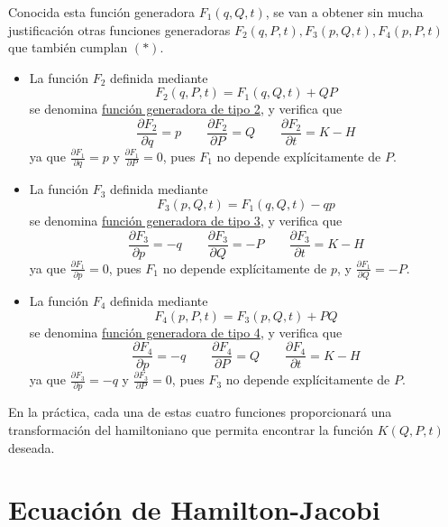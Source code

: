 \documentclass[12pt]{report}
\begin{document}
\vspace{2mm}
Conocida esta función generadora $F_1(q,Q,t)$, se van a obtener sin mucha justificación otras funciones generadoras $F_2(q,P,t), F_3(p,Q,t), F_4(p,P,t)$ que también cumplan $(*)$.

\begin{itemize}
    \item La función $F_2$ definida mediante 
    \[F_2(q,P,t) = F_1(q,Q,t) + QP\]
    se denomina \ul{función generadora de tipo 2}, y verifica que
    \[\frac{\partial F_2}{\partial q} = p \qquad \frac{\partial F_2}{\partial P} = Q \qquad \frac{\partial F_2}{\partial t} = K - H\]
    ya que $\frac{\partial F_1}{\partial q} = p$ y $\frac{\partial F_1}{\partial P} = 0$, pues $F_1$ no depende explícitamente de $P$.
    \item La función $F_3$ definida mediante 
    \[F_3(p,Q,t) = F_1(q,Q,t) - qp\]
    se denomina \ul{función generadora de tipo 3}, y verifica que
    \[\frac{\partial F_3}{\partial p} = - q \qquad \frac{\partial F_3}{\partial Q} = -P \qquad \frac{\partial F_3}{\partial t} = K - H\]
    ya que $\frac{\partial F_1}{\partial p} = 0$, pues $F_1$ no depende explícitamente de $p$, y $\frac{\partial F_1}{\partial Q} = -P$.
    \item La función $F_4$ definida mediante 
    \[F_4(p,P,t) = F_3(p,Q,t) + PQ\]
    se denomina \ul{función generadora de tipo 4}, y verifica que
    \[\frac{\partial F_4}{\partial p} = - q \qquad \frac{\partial F_4}{\partial P} = Q \qquad \frac{\partial F_4}{\partial t} = K - H\]
    ya que $\frac{\partial F_3}{\partial p} = -q$ y $\frac{\partial F_3}{\partial P} = 0$, pues $F_3$ no depende explícitamente de $P$.
\end{itemize}

En la práctica, cada una de estas cuatro funciones proporcionará una transformación del hamiltoniano que permita encontrar la función $K(Q,P,t)$ deseada.

\section{Ecuación de Hamilton-Jacobi}
\end{document}
